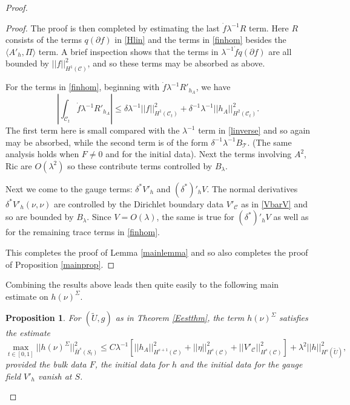 \documentclass[10pt]{amsart}
\renewcommand{\d}{\delta}
\newcommand{\Si}{\Sigma}
\renewcommand{\l}{\lambda}
\newcommand{\cC}{{\mathcal C}}
\newcommand{\cT}{{\mathcal T}}
\newcommand{\Ric}{\mathrm{Ric}}
\newcommand{\be}{\begin{equation}}
\newcommand{\ee}{\end{equation}}
\newcommand{\p}{\partial}
\newcommand{\<}{\langle}
\renewcommand{\>}{\rangle}
\newcommand{\w}{\widetilde}
\theoremstyle{plain}
\newtheorem{proposition}[lemma]{Proposition}
\theoremstyle{remark}
\theoremstyle{definition}
\numberwithin{equation}{section}
\begin{document}
\begin{proof}
\begin{proof}
  The proof is then completed by estimating the last $\dot f \l^{-1}R$ term. Here $R$ consists of the terms $q(\p f)$ in \eqref{Hlin} and the terms in 
  \eqref{finhom} besides the $\<A'_h, \Pi\>$ term. A brief inspection shows that the terms in $\l^{-1}\dot f q(\p f)$ are all bounded by $||f||_{H^1(\cC)}^2$, 
  and so these terms may be absorbed as above. 
  
      For the terms in \eqref{finhom}, beginning with $\dot f \l^{-1}R'_{h_A}$, we have 
 $$|\int_{\cC_t} \dot f \l^{-1}R'_{h_A} | \leq \d \l^{-1}||f||_{H^1(\cC_t)}^2 + \d^{-1}\l^{-1}||h_A||_{H^2(\cC_t)}^2.$$
 The first term here is small compared with the $\l^{-1}$ term in \eqref{linverse} and so again may be absorbed, while the second term is of the form 
 $\d^{-1}\l^{-1}B_{\cT}$. (The same analysis holds when $F \neq 0$ and for the initial data). Next the terms involving $A^2$, $\Ric$ are $O(\l^2)$ so 
 these contribute terms controlled by $B_{\l}$. 
 
  Next we come to the gauge terms: $\d^* V'_h$ and $(\d^*)'_h V$. The normal derivatives $\d^*V'_h(\nu, \nu)$ are controlled by the Dirichlet boundary data 
$V'_{\cC}$ as in \eqref{VbarV} and so are bounded by $B_{\l}$. Since $V = O(\l)$, the same is true for $(\d^*)'_h V$ as well as for the remaining trace 
terms in \eqref{finhom}. 

  This completes the proof of Lemma \ref{mainlemma} and so also completes the proof of Proposition \ref{mainprop}. 

\end{proof}  

  Combining the results above leads then quite easily to the following main estimate on $h(\nu)^{\Si}$. 
  
 \begin{proposition} \label{prophnua}
 For $(\w U, g)$ as in Theorem \ref{Eestthm}, the term $h(\nu)^{\Si}$ satisfies the estimate 
\be \label{hnuSiest}
\max_{t\in [0,1]}||h(\nu)^{\Si}||_{\bar H^s(S_t)}^2 \leq C\l^{-1}[ ||h_A||_{H^{s+1}(\cC)}^2 + ||\eta||_{H^{s}(\cC)}^2 + ||V'_{\cC}||_{H^{s}(\cC)}^2 ] + 
\l^2  ||h||_{H^s(\w U)}^2 ,
\ee
provided the bulk data $F$, the initial data for $h$ and the initial data for the gauge field $V'_h$ vanish at $S$. 
\end{proposition}  


\end{proof}
\end{document}
